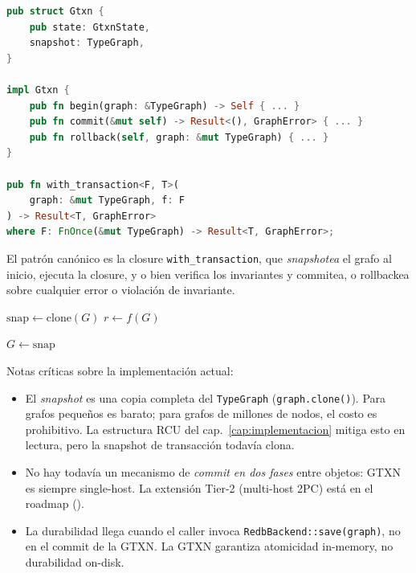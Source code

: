 \begin{lstlisting}[language=rust, caption={GTXN como wrapper sobre el TypeGraph.}, label={lst:gtxn}]
pub struct Gtxn {
    pub state: GtxnState,
    snapshot: TypeGraph,
}

impl Gtxn {
    pub fn begin(graph: &TypeGraph) -> Self { ... }
    pub fn commit(&mut self) -> Result<(), GraphError> { ... }
    pub fn rollback(self, graph: &mut TypeGraph) { ... }
}

pub fn with_transaction<F, T>(
    graph: &mut TypeGraph, f: F
) -> Result<T, GraphError>
where F: FnOnce(&mut TypeGraph) -> Result<T, GraphError>;
\end{lstlisting}

El patrón canónico es la closure \texttt{with\_transaction}, que
\emph{snapshotea} el grafo al inicio, ejecuta la closure, y o bien
verifica los invariantes y commitea, o rollbackea sobre cualquier error
o violación de invariante.

\begin{algorithm}[H]
\SetAlgoLined
{}
\caption{\textsc{WithTransaction}}\label{alg:with-tx}


$\textrm{snap} \gets \textrm{clone}(G)$\;
$r \gets f(G)$\;

$G \gets \textrm{snap}$\;
\;
\end{algorithm}

Notas críticas sobre la implementación actual:

\begin{itemize}
  \item El \emph{snapshot} es una copia completa del \texttt{TypeGraph}
    (\texttt{graph.clone()}). Para grafos pequeños es barato; para grafos
    de millones de nodos, el costo es prohibitivo. La estructura RCU
    del cap.~\ref{cap:implementacion} mitiga esto en lectura, pero la
    snapshot de transacción todavía clona.
  \item No hay todavía un mecanismo de \emph{commit en dos fases} entre
    objetos: GTXN es siempre single-host. La extensión Tier-2 (multi-host
    2PC) está en el roadmap ().
  \item La durabilidad llega cuando el caller invoca
    \texttt{RedbBackend::save(graph)}, no en el commit de la GTXN. La
    GTXN garantiza atomicidad in-memory, no durabilidad on-disk.
\end{itemize}

